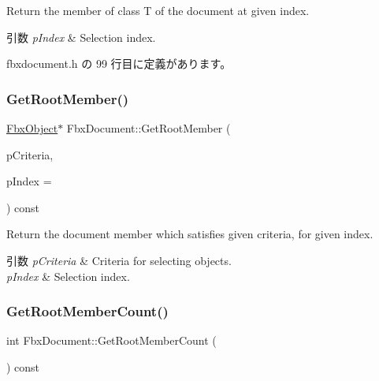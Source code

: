 Return the member of class T of the document at given index. 
\begin{DoxyParams}{引数}
{\em p\+Index} & Selection index. \\
\hline
\end{DoxyParams}


 fbxdocument.\+h の 99 行目に定義があります。

\mbox{\label{class_fbx_document_a7d851d995f21549ff38989289e583086}} 
\subsubsection{\texorpdfstring{Get\+Root\+Member()}{GetRootMember()}\hspace{0.1cm}{\footnotesize\ttfamily [3/3]}}
{\footnotesize\ttfamily \hyperlink{class_fbx_object}{Fbx\+Object}$\ast$ Fbx\+Document\+::\+Get\+Root\+Member (\begin{DoxyParamCaption}\item[{\hyperlink{class_fbx_criteria}{Fbx\+Criteria}}]{p\+Criteria,  }\item[{int}]{p\+Index = {} }\end{DoxyParamCaption}) const}

Return the document member which satisfies given criteria, for given index. 
\begin{DoxyParams}{引数}
{\em p\+Criteria} & Criteria for selecting objects. \\
\hline
{\em p\+Index} & Selection index. \\
\hline
\end{DoxyParams}
\mbox{\label{class_fbx_document_a2fdc38f71ba7db1271c9372e1b3704ec}} 
\subsubsection{\texorpdfstring{Get\+Root\+Member\+Count()}{GetRootMemberCount()}\hspace{0.1cm}{\footnotesize\ttfamily [1/3]}}
{\footnotesize\ttfamily int Fbx\+Document\+::\+Get\+Root\+Member\+Count (\begin{DoxyParamCaption}{ }\end{DoxyParamCaption}) const\hspace{0.3cm}{\ttfamily [inline]}}



